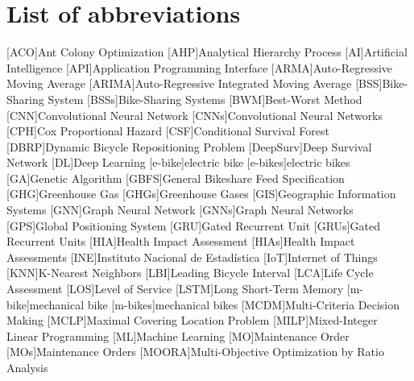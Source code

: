\chapter*{List of abbreviations}
\begin{acronym}
        [ACO]{Ant Colony Optimization}
        [AHP]{Analytical Hierarchy Process}
        [AI]{Artificial Intelligence}
        [API]{Application Programming Interface}
        [ARMA]{Auto-Regressive Moving Average}
        [ARIMA]{Auto-Regressive Integrated Moving Average}
        [BSS]{Bike-Sharing System}
        [BSSs]{Bike-Sharing Systems}
        [BWM]{Best-Worst Method}
        [CNN]{Convolutional Neural Network}
        [CNNs]{Convolutional Neural Networks}
        [CPH]{Cox Proportional Hazard}
        [CSF]{Conditional Survival Forest}
        [DBRP]{Dynamic Bicycle Repositioning Problem}
        [DeepSurv]{Deep Survival Network}
        [DL]{Deep Learning}
        [e-bike]{electric bike}
        [e-bikes]{electric bikes}
        [GA]{Genetic Algorithm}
        [GBFS]{General Bikeshare Feed Specification}
        [GHG]{Greenhouse Gas}
        [GHGs]{Greenhouse Gases}
        [GIS]{Geographic Information Systems}
        [GNN]{Graph Neural Network}
        [GNNs]{Graph Neural Networks}
        [GPS]{Global Positioning System}
        [GRU]{Gated Recurrent Unit}
        [GRUs]{Gated Recurrent Units}
        [HIA]{Health Impact Assessment}
        [HIAs]{Health Impact Assessments}
        [INE]{Instituto Nacional de Estadística}
        [IoT]{Internet of Things}
        [KNN]{K-Nearest Neighbors}
        [LBI]{Leading Bicycle Interval}
        [LCA]{Life Cycle Assessment}
        [LOS]{Level of Service}
        [LSTM]{Long Short-Term Memory}
        [m-bike]{mechanical bike}
        [m-bikes]{mechanical bikes}
        [MCDM]{Multi-Criteria Decision Making}
        [MCLP]{Maximal Covering Location Problem}
        [MILP]{Mixed-Integer Linear Programming}
        [ML]{Machine Learning}
        [MO]{Maintenance Order}
        [MOs]{Maintenance Orders}
        [MOORA]{Multi-Objective Optimization by Ratio Analysis}

\end{acronym}
